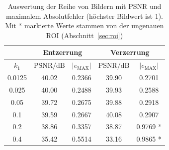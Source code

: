 \begin{table}
	\centering
\begin{tabular}{|c|c|c|c|c|}
	\hline 
	\rule[-1ex]{0pt}{2.5ex}  & \multicolumn{2}{c|}{Entzerrung} & \multicolumn{2}{c|}{Verzerrung}  \\ 
	\hline 
	\rule[-1ex]{0pt}{2.5ex} $k_1$ & $\text{PSNR}/\text{dB}$ & $|e_\text{MAX}|$ & $\text{PSNR}/\text{dB}$ & $|e_\text{MAX}|$ \\ 
	\hline 
	\rule[-1ex]{0pt}{2.5ex} 0.0125 & 40.02 & 0.2366 & 39.90 & 0.2701 \\ 
	\hline 
	\rule[-1ex]{0pt}{2.5ex} 0.025 & 40.00 & 0.2488 & 39.93 & 0.2588 \\ 
	\hline 
	\rule[-1ex]{0pt}{2.5ex} 0.05 & 39.72 & 0.2675 & 39.88 & 0.2918 \\ 
	\hline 
	\rule[-1ex]{0pt}{2.5ex} 0.1 & 39.59 & 0.2667 & 40.08 & 0.2907 \\ 
	\hline 
	\rule[-1ex]{0pt}{2.5ex} 0.2 & 38.86 & 0.3357 & 38.87 & 0.9769 * \\ 
	\hline 
	\rule[-1ex]{0pt}{2.5ex} 0.4 & 35.42 & 0.5514 & 33.16 & 0.9865 * \\ 
	\hline 
\end{tabular} 

\caption{Auswertung der Reihe von Bildern mit PSNR und maximalem Absolutfehler (höchster Bildwert ist 1). Mit * markierte Werte stammen von der ungenauen ROI (Abschnitt~\ref{sec:roi})}
\label{tbl:comparison}
\end{table}










 
